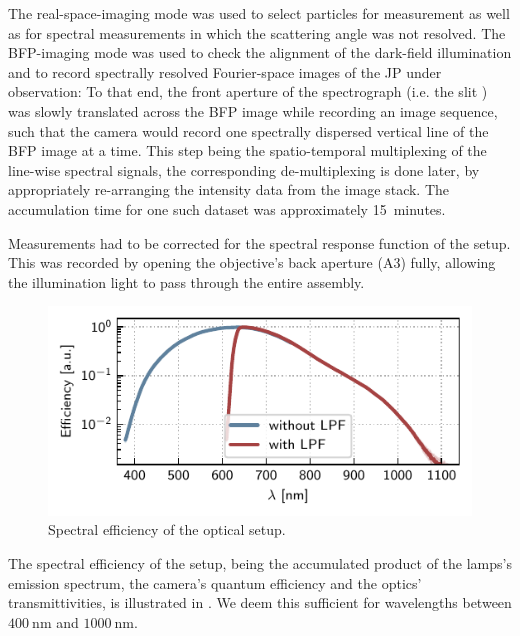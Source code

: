 \documentclass[10pt]{article}
\newcommand{\reffig}[2]{\mbox{\sffamily{Figure \ref{#1}#2}}}
\begin{document}
The real-space-imaging mode was used to select particles for measurement as well as for spectral measurements in which the scattering angle was not resolved. 
The BFP-imaging mode was used to check the alignment of the dark-field illumination and to record spectrally resolved Fourier-space images of the JP under observation: 
To that end, the front aperture of the spectrograph (i.e. the slit {}) was slowly translated across the BFP image while recording an image sequence, such that the camera would record one spectrally dispersed vertical line of the BFP image at a time. 
This step being the spatio-temporal multiplexing of the line-wise spectral signals, the corresponding de-multiplexing is done later, by appropriately re-arranging the intensity data from the image stack. 
The accumulation time for one such dataset was approximately \mbox{15 minutes}. 

Measurements had to be corrected for the spectral response function of the setup. 
This was recorded by opening the objective's back aperture {\sffamily(A3)} fully, allowing the illumination light to pass through the entire assembly. 

\begin{figure}[h]
    \centering
    \includegraphics[width=\columnwidth]{corrections-log}
    \caption{Spectral efficiency of the optical setup.}
    \label{fig:corrections}
\end{figure}

The spectral efficiency of the setup, being the accumulated product of the lamps's emission spectrum, the camera's quantum efficiency and the optics' transmittivities, is illustrated in \reffig{fig:corrections}{}. 
We deem this sufficient for wavelengths between $\SI{400}{\nano\meter}$ and $\SI{1000}{\nano\meter}$. 
\end{document}
